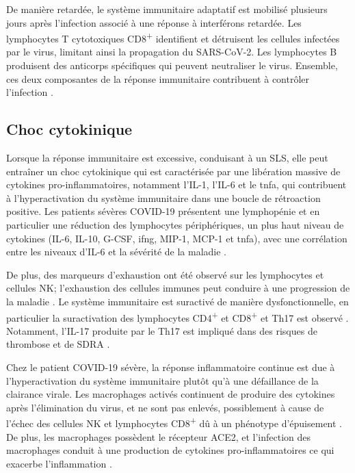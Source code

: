 \documentclass[
  a4paper,
  DIV=11,
  numbers=noendperiod,
  listof=totoc]{scrreprt}
\begin{document}
De manière retardée, le système immunitaire adaptatif est mobilisé
plusieurs jours après l'infection associé à une réponse à interférons
retardée. Les lymphocytes T cytotoxiques CD8\textsuperscript{+}
identifient et détruisent les cellules infectées par le virus, limitant
ainsi la propagation du \ac{SARS-CoV-2}. Les lymphocytes B produisent
des anticorps spécifiques qui peuvent neutraliser le virus. Ensemble,
ces deux composantes de la réponse immunitaire contribuent à contrôler
l'infection \autocite{Marik.2021}.

\subsection{Choc cytokinique}\label{choc-cytokinique}

Lorsque la réponse immunitaire est excessive, conduisant à un \ac{SLS},
elle peut entraîner un choc cytokinique qui est caractérisée par une
libération massive de cytokines pro-inflammatoires, notamment l'IL-1,
l'IL-6 et le \ac{tnfa}, qui contribuent à l'hyperactivation du système
immunitaire dans une boucle de rétroaction positive. Les patients
sévères COVID-19 présentent une lymphopénie et en particulier une
réduction des lymphocytes périphériques, un plus haut niveau de
cytokines (IL-6, IL-10, G-CSF, \ac{ifng}, \ac{MIP-1}, \ac{MCP-1} et
\ac{tnfa}), avec une corrélation entre les niveaux d'IL-6 et la sévérité
de la maladie \autocite{Yuki.2020}.

De plus, des marqueurs d'exhaustion ont été observé sur les lymphocytes
et cellules NK; l'exhaustion des cellules immunes peut conduire à une
progression de la maladie \autocite{Yuki.2020}. Le système immunitaire
est suractivé de manière dysfonctionnelle, en particulier la
suractivation des lymphocytes CD4\textsuperscript{+} et
CD8\textsuperscript{+} et Th17 est observé \autocite{Xu.2020}.
Notamment, l'IL-17 produite par le Th17 est impliqué dans des risques de
thrombose et de \ac{SDRA} \autocite{Raucci.2020}.

Chez le patient COVID-19 sévère, la réponse inflammatoire continue est
due à l'hyperactivation du système immunitaire plutôt qu'à une
défaillance de la clairance virale. Les macrophages activés continuent
de produire des cytokines après l'élimination du virus, et ne sont pas
enlevés, possiblement à cause de l'échec des cellules NK et lymphocytes
CD8\textsuperscript{+} dû à un phénotype d'épuisement
\autocite{Marik.2021}. De plus, les macrophages possèdent le récepteur
ACE2, et l'infection des macrophages conduit à une production de
cytokines pro-inflammatoires ce qui exacerbe l'inflammation
\autocite{Marik.2021}.
\end{document}
